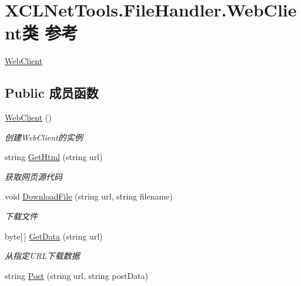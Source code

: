 \hypertarget{class_x_c_l_net_tools_1_1_file_handler_1_1_web_client}{\section{X\-C\-L\-Net\-Tools.\-File\-Handler.\-Web\-Client类 参考}
\label{class_x_c_l_net_tools_1_1_file_handler_1_1_web_client}
}


\hyperlink{class_x_c_l_net_tools_1_1_file_handler_1_1_web_client}{Web\-Client}  


\subsection*{Public 成员函数}
\begin{DoxyCompactItemize}
\item 
\hyperlink{class_x_c_l_net_tools_1_1_file_handler_1_1_web_client_a8f3cbaf1baf5d142caab2f6c9cc04a7f}{Web\-Client} ()
\begin{DoxyCompactList}\small\item\em 创建\-Web\-Client的实例 \end{DoxyCompactList}\item 
string \hyperlink{class_x_c_l_net_tools_1_1_file_handler_1_1_web_client_a504910f5e28a6fa620853f069d3c756b}{Get\-Html} (string url)
\begin{DoxyCompactList}\small\item\em 获取网页源代码 \end{DoxyCompactList}\item 
void \hyperlink{class_x_c_l_net_tools_1_1_file_handler_1_1_web_client_ace80aaf94d3e0c6eceb3ad182b8de947}{Download\-File} (string url, string filename)
\begin{DoxyCompactList}\small\item\em 下载文件 \end{DoxyCompactList}\item 
byte\mbox{[}$\,$\mbox{]} \hyperlink{class_x_c_l_net_tools_1_1_file_handler_1_1_web_client_a7208770077f210c3dd7bee2b34f0a4eb}{Get\-Data} (string url)
\begin{DoxyCompactList}\small\item\em 从指定\-U\-R\-L下载数据 \end{DoxyCompactList}\item 
string \hyperlink{class_x_c_l_net_tools_1_1_file_handler_1_1_web_client_ab2497ff9ed5a5b867362b7bc0b38edb1}{Post} (string url, string post\-Data)

\end{DoxyCompactItemize}
